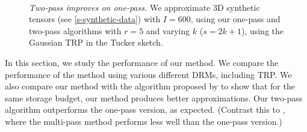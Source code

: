\begin{figure}
\begin{subfigure}{0.55\textwidth}
	\end{subfigure}
	\\
	\caption{\textit{Two-pass improves on one-pass.}
	We approximate 3D synthetic tensors (see \ref{s-synthetic-data}) with $I = 600$,
	using our one-pass and two-pass algorithms with $r = 5$ and varying $k$ ($s = 2k+1$),
	using the Gaussian TRP in the Tucker sketch.
	\label{fig:vary-k-600-compare}
  }
\end{figure}
In this section, we study the performance of our method.
We compare the performance of the method using various different
DRMs, including TRP.
We also compare our method with the algorithm proposed by \cite{malik2018low}
to show that for the same storage budget, our method produces better approximations.
Our two-pass algorithm outperforms the one-pass version, as expected.
(Contrast this to \cite{malik2018low}, where the multi-pass method
performs less well than the one-pass version.)

